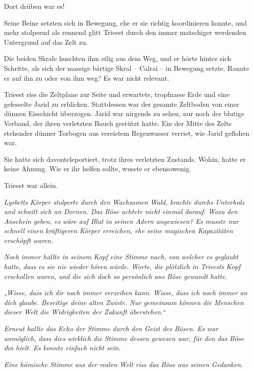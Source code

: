 Dort drüben war es!

Seine Beine setzten sich in Bewegung, ehe er sie richtig koordinieren konnte, und mehr stolpernd als rennend glitt Trieest durch den immer matschiger werdenden Untergrund auf das Zelt zu.

Die beiden Skrale huschten ihm eilig aus dem Weg, und er hörte hinter sich Schritte, als sich der massige bärtige Skral – Calrai – in Bewegung setzte. Rannte er auf ihn zu oder von ihm weg? Es war nicht relevant.

Trieest riss die Zeltplane zur Seite und erwartete, tropfnasse Erde und eine gefesselte Jarid zu erblicken. Stattdessen war der gesamte Zeltboden von einer dünnen Eisschicht überzogen. Jarid war nirgends zu sehen, nur noch der blutige Verband, der ihren verletzten Bauch gestützt hatte. Ein der Mitte des Zelts stehender dünner Torbogen aus vereistem Regenwasser verriet, wie Jarid geflohen war.

Sie hatte sich davonteleportiert, trotz ihres verletzten Zustands. Wohin, hatte er keine Ahnung. Wie er ihr helfen sollte, wusste er ebensowenig.

Trieest war allein.



\trennzeichen



\textit{Lysbetts Körper stolperte durch den Wachsamen Wald, krachte durchs Unterholz und schnitt sich an Dornen. Das Böse achtete nicht einmal darauf. Wozu den Anschein geben, es wäre auf Blut in seinen Adern angewiesen? Es musste nur schnell einen kräftigeren Körper erreichen, ehe seine magischen Kapazitäten erschöpft waren.}

\textit{Noch immer hallte in seinem Kopf eine Stimme nach, von welcher es geglaubt hatte, dass es sie nie wieder hören würde. Worte, die plötzlich in Trieests Kopf erschollen waren, und die sich doch so persönlich ans Böse gewandt hatte.}

\textit{„Wisse, dass ich dir noch immer verzeihen kann. Wisse, dass ich noch immer an dich glaube. Beseitige deine alten Zwiste. Nur gemeinsam können die Menschen dieser Welt die Widrigkeiten der Zukunft überstehen.“}

\textit{Erneut hallte das Echo der Stimme durch den Geist des Bösen. Es war unmöglich, dass dies wirklich die Stimme dessen gewesen war, für den das Böse ihn hielt. Es konnte einfach nicht sein.}

\textit{Eine hämische Stimme aus der realen Welt riss das Böse aus seinen Gedanken.}

